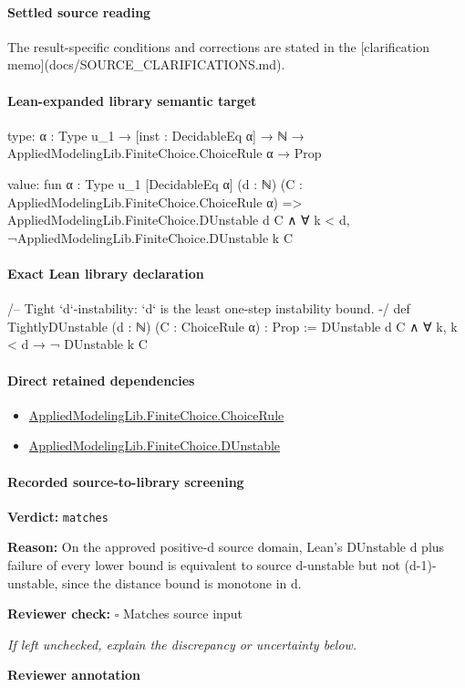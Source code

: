 \documentclass[10pt]{article}
\newcommand{\reviewerbox}{%
  \par\noindent\fbox{\parbox{0.96\linewidth}{\rule{0pt}{0.38in}}}\par
}
\newcommand{\reviewmatch}[1]{%
  \par\noindent\textbf{Reviewer check:} $\square$\; #1\par
  \noindent\emph{If left unchecked, explain the discrepancy or uncertainty below.}\par
}
\begin{document}
\paragraph{Settled source reading}
The result-\allowbreak{}specific conditions and corrections are stated in the [clarification memo](docs/\allowbreak{}SOURCE\_\allowbreak{}CLARIFICATIONS.\allowbreak{}md).\allowbreak{}

\paragraph{Lean-expanded library semantic target}
\begin{ReviewVerbatim}
type:
{α : Type u_1} → [inst : DecidableEq α] → ℕ → AppliedModelingLib.FiniteChoice.ChoiceRule α → Prop

value:
fun {α : Type u_1} [DecidableEq α] (d : ℕ) (C : AppliedModelingLib.FiniteChoice.ChoiceRule α) =>
  AppliedModelingLib.FiniteChoice.DUnstable d C ∧ ∀ k < d, ¬AppliedModelingLib.FiniteChoice.DUnstable k C
\end{ReviewVerbatim}

\paragraph{Exact Lean library declaration}
\begin{ReviewVerbatim}
/-- Tight `d`-instability: `d` is the least one-step instability bound. -/
def TightlyDUnstable (d : ℕ) (C : ChoiceRule α) : Prop :=
  DUnstable d C ∧ ∀ k, k < d → ¬ DUnstable k C
\end{ReviewVerbatim}

\paragraph{Direct retained dependencies}
\begin{itemize}\raggedright
\item \hyperlink{library-prerequisite-5dea5c3766008208}{Applied\allowbreak{}Modeling\allowbreak{}Lib.\allowbreak{}Finite\allowbreak{}Choice.\allowbreak{}Choice\allowbreak{}Rule}
\item \hyperlink{library-prerequisite-6cea78f6cd82039c}{Applied\allowbreak{}Modeling\allowbreak{}Lib.\allowbreak{}Finite\allowbreak{}Choice.\allowbreak{}D\allowbreak{}Unstable}
\end{itemize}
\paragraph{Recorded source-to-library screening}
\textbf{Verdict:} \texttt{matches}
\\
{\raggedright
\textbf{Reason:} On the approved positive-\allowbreak{}d source domain, Lean's DUnstable d plus failure of every lower bound is equivalent to source d-\allowbreak{}unstable but not (d-\allowbreak{}1)-\allowbreak{}unstable, since the distance bound is monotone in d.\allowbreak{}
\par}
\reviewmatch{Matches source input}
\noindent\textbf{Reviewer annotation}\par
\reviewerbox
\clearpage
\hypertarget{library-prerequisite-abc5950f6d631dc4}{}
\end{document}
